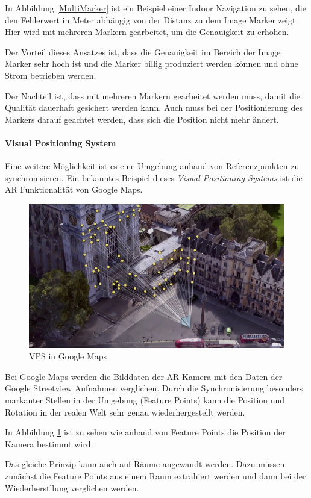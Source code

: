 \documentclass[titlepage, a4paper, 11pt]{scrartcl}
\begin{document}
  In Abbildung \ref{MultiMarker} ist ein Beispiel einer Indoor Navigation zu sehen, die den Fehlerwert in Meter abhängig von der Distanz zu dem Image Marker zeigt.
  Hier wird mit mehreren Markern gearbeitet, um die Genauigkeit zu erhöhen.

  Der Vorteil dieses Ansatzes ist, dass die Genauigkeit im Bereich der Image Marker sehr hoch ist und die Marker billig produziert werden können und ohne Strom betrieben werden.

  Der Nachteil ist, dass mit mehreren Markern gearbeitet werden muss, damit die Qualität dauerhaft gesichert werden kann. Auch muss bei der Positionierung des Markers darauf geachtet werden, dass sich die Position nicht mehr ändert.

  \paragraph{Visual Positioning System}

  Eine weitere Möglichkeit ist es eine Umgebung anhand von Referenzpunkten zu synchronisieren.
  Ein bekanntes Beispiel dieses \textit{Visual Positioning Systems} ist die AR Funktionalität von Google Maps.
  
  \begin{figure}[h]
    \centering
    \includegraphics[width=.5\textwidth]{vps-google}
    \caption{VPS in Google Maps \cite{GoogleMa12:online}}
    \label{VPSGoogle}
  \end{figure}

  Bei Google Maps werden die Bilddaten der AR Kamera mit den Daten der Google Streetview Aufnahmen verglichen.
  Durch die Synchronisierung besonders markanter Stellen in der Umgebung (Feature Points) kann die Position und Rotation in der realen Welt sehr genau wiederhergestellt werden.

  In Abbildung \ref{VPSGoogle} ist zu sehen wie anhand von Feature Points die Position der Kamera bestimmt wird.

  Das gleiche Prinzip kann auch auf Räume angewandt werden. Dazu müssen zunächst die Feature Points aus einem Raum extrahiert werden und dann bei der Wiederherstllung verglichen werden.
\end{document}
